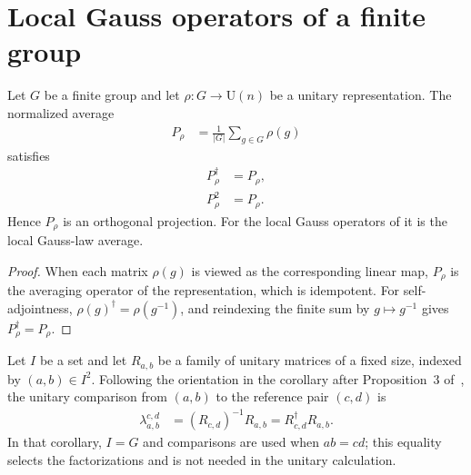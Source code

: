 \section{Local Gauss operators of a finite group}
\label{sec:monomial_gauss}

\begin{lemma}
    \label{thm:mpug_finite_group_unitary_average_projection}
    \leanok
    Let $G$ be a finite group and let $\rho\colon G\to\mathrm U(n)$ be a
    unitary representation. The normalized average
    \begin{align}
        P_\rho & = \frac{1}{|G|}\sum_{g\in G}\rho(g)
        \label{eq:mpug_finite_group_unitary_average}
    \end{align}
    satisfies
    \begin{align}
        P_\rho^\dagger & =P_\rho, \\
        P_\rho^2       & =P_\rho.
    \end{align}
    Hence $P_\rho$ is an orthogonal projection. For the local Gauss operators
    of \cite[lines~457--461]{FrancoRubio2025MPUGauging} it is the local
    Gauss-law average.
\end{lemma}

\begin{proof}\leanok
    When each matrix $\rho(g)$ is viewed as the corresponding linear map,
    $P_\rho$ is the averaging operator of the representation, which is
    idempotent. For self-adjointness, $\rho(g)^\dagger=\rho(g^{-1})$, and
    reindexing the finite sum by $g\mapsto g^{-1}$ gives
    $P_\rho^\dagger=P_\rho$.
\end{proof}

\begin{definition}
    \label{def:mpug_unitary_factorization_comparison}
    \leanok
    Let $I$ be a set and let $R_{a,b}$ be a family of unitary matrices of a
    fixed size, indexed by $(a,b)\in I^2$. Following the orientation in the
    corollary after Proposition~3
    of~\cite[lines~2782--2821]{FrancoRubio2025MPUGauging}, the unitary
    comparison from $(a,b)$ to the reference pair $(c,d)$ is
    \begin{align}
        \lambda_{a,b}^{c,d}
         & =(R_{c,d})^{-1}R_{a,b}
        =R_{c,d}^\dagger R_{a,b}.
        \label{eq:mpug_unitary_factorization_comparison}
    \end{align}
    In that corollary, $I=G$ and comparisons are used when $ab=cd$; this
    equality selects the factorizations and is not needed in the unitary
    calculation.
\end{definition}

